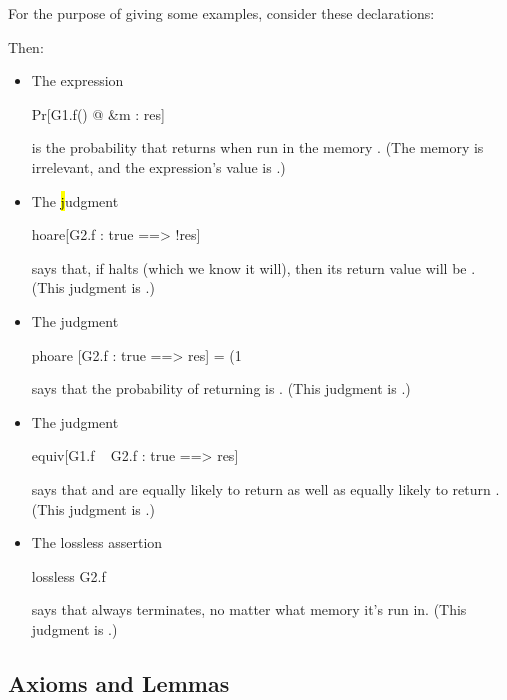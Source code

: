 For the purpose of giving some examples, consider these declarations:
Then:
\begin{itemize}
\item The expression
\begin{easycrypt}{}{}
Pr[G1.f() @ &m : res]
\end{easycrypt}
is the probability that  returns  when run
in the memory . (The memory is irrelevant, and the expression's
value is .)

\item The \hl judgment
\begin{easycrypt}{}{}
hoare[G2.f : true ==> !res]
\end{easycrypt}
says that, if  halts (which we know it will), then
its return value will be . (This judgment is .)

\item The \phl judgment
\begin{easycrypt}{}{}
phoare [G2.f : true ==> res] = (1%
\end{easycrypt}
says that the probability of  returning  is
. (This judgment is .)

\item The \prhl judgment
\begin{easycrypt}{}{}
equiv[G1.f ~ G2.f : true ==> res]
\end{easycrypt}
says that  and  are equally likely to return
 as well as equally likely to return .
(This judgment is .)

\item The lossless assertion
\begin{easycrypt}{}{}
lossless G2.f    
\end{easycrypt}
says that  always terminates, no matter what memory it's
run in. (This judgment is .)
\end{itemize}

\subsection{Axioms and Lemmas}

